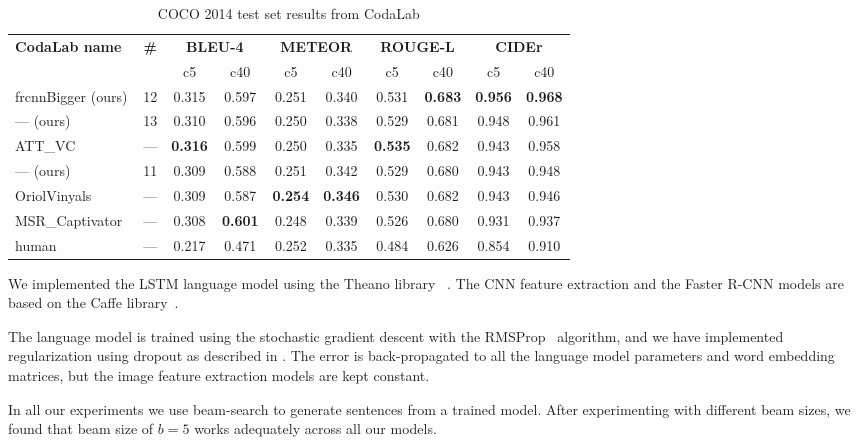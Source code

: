 \begin{table}[htp]
  \newcommand{\mct}[1]{%
    \multicolumn{2}{c|}{\bf#1}}
  \centering
  \caption{COCO 2014 test set results from CodaLab}
  \begin{tabular}{||l|c|c|c|c|c|c|c|c|c||}
    \hline\hline
    \multirow{2}{*}{\bf CodaLab name}&\multirow{2}{*}{\bf\#}
                       &\mct{BLEU-4} &\mct{METEOR} &\mct{ROUGE-L}&\mct{CIDEr}\\\cline{3-10}
                &     & c5    & c40   &  c5   & c40   & c5  &  c40  &  c5  &  c40 \\\hline\hline
    frcnnBigger (ours)& 12    & 0.315 & 0.597 & 0.251 &0.340& 0.531 &\bf0.683&\bf0.956&\bf0.968\\
    --- (ours)        & 13    & 0.310 & 0.596 & 0.250 &0.338& 0.529 & 0.681& 0.948& 0.961\\
    ATT\_VC~\cite{you2016image}& ---   &\bf0.316&0.599 & 0.250 &0.335&\bf0.535&0.682& 0.943& 0.958\\
    --- (ours)        & 11    & 0.309 & 0.588 & 0.251 &0.342& 0.529 & 0.680& 0.943& 0.948\\
    OriolVinyals~\cite{Vinyals_2015_CVPR}      & ---   & 0.309 & 0.587 &\bf0.254&\bf0.346& 0.530 & 0.682& 0.943& 0.946\\
    MSR\_Captivator~\cite{Fang2015} & ---   & 0.308 &\bf0.601& 0.248 &0.339& 0.526 & 0.680& 0.931& 0.937\\
    human~\cite{Chen2015}& ---   & 0.217 & 0.471 & 0.252 &0.335& 0.484 & 0.626 & 0.854 & 0.910\\\hline
    \hline
  \end{tabular}
  \label{tab:resultsTest}
\end{table}

We implemented the LSTM language model using the Theano library~%
\cite{Bastien-Theano-2012}.
The CNN feature extraction and the Faster R-CNN models are based on the Caffe
library~\cite{jia2014caffe}.

The language model is trained using the stochastic gradient descent with the
RMSProp~\cite{rmspropTielman} algorithm, and we have implemented regularization
using dropout as described in \cite{ZarembaSV14}.
The error is back-propagated to all the language model parameters and word
embedding matrices, but the image feature extraction models are kept constant.

In all our experiments we use beam-search to generate sentences from a trained
model.
After experimenting with different beam sizes, we found that beam size of $b=5$
works adequately across all our models.

